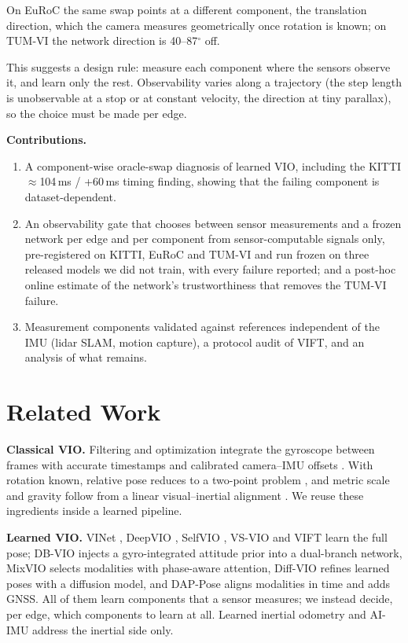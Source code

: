\documentclass[letterpaper,journal]{IEEEtran}
\begin{document}
On EuRoC the same swap points at a different component, the translation direction, which the camera measures geometrically once rotation is known; on TUM-VI the network direction is 40--87$^\circ$ off.

This suggests a design rule: measure each component where the sensors observe it, and learn only the rest. Observability varies along a trajectory (the step length is unobservable at a stop or at constant velocity, the direction at tiny parallax), so the choice must be made per edge.

\textbf{Contributions.}
\begin{enumerate}
\item A component-wise oracle-swap diagnosis of learned VIO, including the KITTI $\approx$104\,ms / +60\,ms timing finding, showing that the failing component is dataset-dependent.
\item An observability gate that chooses between sensor measurements and a frozen network per edge and per component from sensor-computable signals only, pre-registered on KITTI, EuRoC and TUM-VI and run frozen on three released models we did not train, with every failure reported; and a post-hoc online estimate of the network's trustworthiness that removes the TUM-VI failure.
\item Measurement components validated against references independent of the IMU (lidar SLAM, motion capture), a protocol audit of VIFT, and an analysis of what remains.
\end{enumerate}

\section{Related Work}

\textbf{Classical VIO.} Filtering \cite{Mourikis2007} and optimization \cite{Leutenegger2015,Qin2018,Campos2021} integrate the gyroscope between frames with accurate timestamps and calibrated camera--IMU offsets \cite{Furgale2013,Qin2018b}. With rotation known, relative pose reduces to a two-point problem \cite{Kneip2011,Troiani2014}, and metric scale and gravity follow from a linear visual--inertial alignment \cite{Martinelli2014,Qin2017}. We reuse these ingredients inside a learned pipeline.

\textbf{Learned VIO.} VINet \cite{Clark2017}, DeepVIO \cite{Han2019}, SelfVIO \cite{Almalioglu2022}, VS-VIO \cite{Yang2022} and VIFT \cite{Kurt2024} learn the full pose; DB-VIO \cite{Wan2026} injects a gyro-integrated attitude prior into a dual-branch network, MixVIO \cite{Ma2026} selects modalities with phase-aware attention, Diff-VIO \cite{Qin2026} refines learned poses with a diffusion model, and DAP-Pose \cite{DAPPose} aligns modalities in time and adds GNSS. All of them learn components that a sensor measures; we instead decide, per edge, which components to learn at all. Learned inertial odometry \cite{Liu2020,Herath2020} and AI-IMU \cite{Brossard2020} address the inertial side only.
\end{document}
